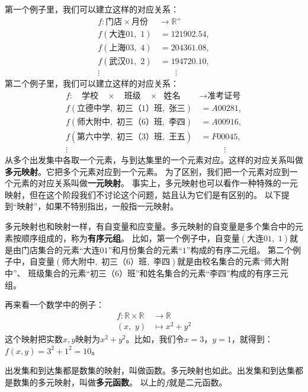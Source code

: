 \documentclass[12pt,UTF8]{ctexbook}
\begin{document}
第一个例子里，我们可以建立这样的对应关系：
\begin{align*}
    f :\mbox{门店} \times \mbox{月份} &\rightarrow \mathbb{R}^+  \\
    f(\mbox{大连}01, \,\, 1) &\,= 121902.54,  \\
    f(\mbox{上海}03, \,\, 4) &\,= 204361.08,  \\
    f(\mbox{武汉}01, \,\, 2) &\,= 194720.10,  \\
    \vdots \quad & \quad\quad \vdots 
\end{align*}
第二个例子里，我们可以建立这样的对应关系：
\begin{align*}
    f :\quad\mbox{学校} \quad \times \quad \mbox{班级} \quad \times \,\,\,\, \mbox{姓名} \,\, &\rightarrow \mbox{准考证号}  \\
    f(\mbox{立德中学}, \,\, \mbox{初三（1）班}, \,\, \mbox{张三}) &\,= A00281,  \\
    f(\mbox{师大附中}, \,\, \mbox{初三（6）班}, \,\, \mbox{李四}) &\,= A00916,  \\
    f(\mbox{第六中学}, \,\, \mbox{初三（3）班}, \,\, \mbox{王五}) &\,= F00045,  \\
    \vdots \quad\quad & \quad\quad\quad \vdots 
\end{align*}
从多个出发集中各取一个元素，与到达集里的一个元素对应。这样的对应关系叫做\textbf{多元映射}。它把多个元素对应到一个元素。
为了区别，我们把一个元素对应到一个元素的对应关系叫做\textbf{一元映射}。
事实上，多元映射也可以看作一种特殊的一元映射，但在这个阶段我们不讨论这个问题，姑且认为它们是有区别的。
以下提到“映射”，如果不特别指出，一般指一元映射。

多元映射也和映射一样，有自变量和应变量。多元映射的自变量是多个集合中的元素按顺序组成的，称为\textbf{有序元组}。
比如，第一个例子中，自变量$(\mbox{大连}01, \,\, 1)$就是由门店集合的元素“大连$01$”和月份集合的元素“$1$”构成的有序二元组。
第二个例子中，自变量$(\mbox{师大附中}, \,\, \mbox{初三（6）班}, \,\, \mbox{李四})$就是由校名集合的元素“师大附中”、
班级集合的元素“初三（$6$）班”和姓名集合的元素“李四”构成的有序三元组。

再来看一个数学中的例子：
\begin{align*}
    f: \mathbb{R} \times \mathbb{R} &\rightarrow \mathbb{R}  \\
    (x,\,\, y) &\mapsto x^2 + y^2  
\end{align*}
这个映射把实数$x,y$映射为$x^2 + y^2$。比如，我们令$x = 3$，$y =1$，就得到：
$f(x,y) = 3^2 + 1^2 = 10$。

出发集和到达集都是数集的映射，叫做函数。多元映射也如此。出发集和到达集都是数集的多元映射，叫做\textbf{多元函数}。
以上的$f$就是二元函数。
\end{document}
